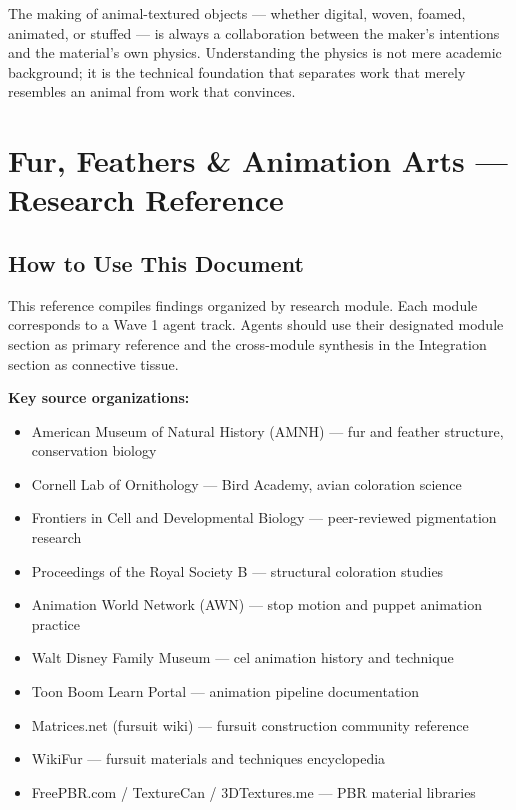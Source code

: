 \documentclass[11pt,letterpaper]{article}
\newcommand{\stageheader}[2]{%
  \noindent\colorbox{#2}{\makebox[\textwidth][l]{%
    \textcolor{white}{\bfseries\sffamily\hspace{6pt}#1\hspace{6pt}}}}%
  \vspace{0.5em}\par%
}
\begin{document}
The making of animal-textured objects --- whether digital, woven, foamed, animated, or stuffed --- is always a collaboration between the maker's intentions and the material's own physics. Understanding the physics is not mere academic background; it is the technical foundation that separates work that merely resembles an animal from work that convinces.

\newpage

\stageheader{STAGE 2 --- RESEARCH REFERENCE}{secondary}

\section{Fur, Feathers \& Animation Arts --- Research Reference}

\subsection{How to Use This Document}

This reference compiles findings organized by research module. Each module corresponds to a Wave 1 agent track. Agents should use their designated module section as primary reference and the cross-module synthesis in the Integration section as connective tissue.

\textbf{Key source organizations:}
\begin{itemize}[noitemsep]
  \item American Museum of Natural History (AMNH) --- fur and feather structure, conservation biology
  \item Cornell Lab of Ornithology --- Bird Academy, avian coloration science
  \item Frontiers in Cell and Developmental Biology --- peer-reviewed pigmentation research
  \item Proceedings of the Royal Society B --- structural coloration studies
  \item Animation World Network (AWN) --- stop motion and puppet animation practice
  \item Walt Disney Family Museum --- cel animation history and technique
  \item Toon Boom Learn Portal --- animation pipeline documentation
  \item Matrices.net (fursuit wiki) --- fursuit construction community reference
  \item WikiFur --- fursuit materials and techniques encyclopedia
  \item FreePBR.com / TextureCan / 3DTextures.me --- PBR material libraries
\end{itemize}
\end{document}

